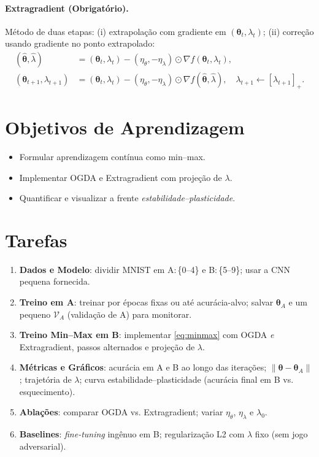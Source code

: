 \documentclass[9pt,a4paper]{extarticle}
\begin{document}
\paragraph{Extragradient (Obrigatório).}
Método de duas etapas: (i) extrapolação com gradiente em $(\bm{\theta}_t,\lambda_t)$; (ii) correção usando gradiente no ponto extrapolado:
\begin{align}
(\hat{\bm{\theta}},\hat{\lambda}) &= (\bm{\theta}_t,\lambda_t) - (\eta_\theta,-\eta_\lambda)\odot \nabla f(\bm{\theta}_t,\lambda_t),\\
(\bm{\theta}_{t+1},\lambda_{t+1}) &= (\bm{\theta}_t,\lambda_t) - (\eta_\theta,-\eta_\lambda)\odot \nabla f(\hat{\bm{\theta}},\hat{\lambda}),\quad \lambda_{t+1}\leftarrow[\lambda_{t+1}]_+.
\end{align}

\section*{Objetivos de Aprendizagem}
\begin{itemize}
  \item Formular aprendizagem contínua como min--max.
  \item Implementar OGDA e Extragradient com projeção de $\lambda$.
  \item Quantificar e visualizar a frente \emph{estabilidade--plasticidade}.
\end{itemize}

\section*{Tarefas}
\begin{enumerate}
  \item \textbf{Dados e Modelo}: dividir MNIST em A:\,\{0--4\} e B:\,\{5--9\}; usar a CNN pequena fornecida.
  \item \textbf{Treino em A}: treinar por épocas fixas ou até acurácia-alvo; salvar $\bm{\theta}_A$ e um pequeno $\mathcal{V}_A$ (validação de A) para monitorar.
  \item \textbf{Treino Min--Max em B}: implementar \eqref{eq:minmax} com OGDA \emph{e} Extragradient, passos alternados e projeção de $\lambda$.
  \item \textbf{Métricas e Gráficos}: acurácia em A e B ao longo das iterações; $\lVert\bm{\theta}-\bm{\theta}_A\rVert$; trajetória de $\lambda$; curva estabilidade--plasticidade (acurácia final em B vs. esquecimento).
  \item \textbf{Ablações}: comparar OGDA vs. Extragradient; variar $\eta_\theta$, $\eta_\lambda$ e $\lambda_0$.
  \item \textbf{Baselines}: \emph{fine-tuning} ingênuo em B; regularização L2 com $\lambda$ fixo (sem jogo adversarial).
\end{enumerate}
\end{document}
